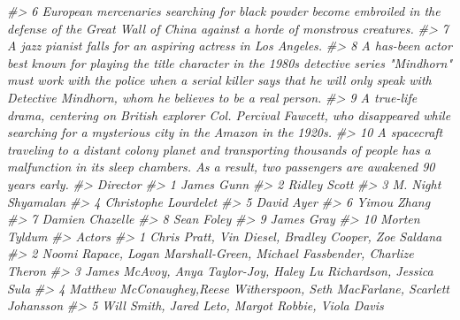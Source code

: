 \documentclass[
]{book}
\newenvironment{Shaded}{\begin{snugshade}}{\end{snugshade}}
\newcommand{\CommentTok}[1]{\textcolor[rgb]{0.56,0.35,0.01}{\textit{#1}}}
\begin{document}
\begin{Shaded}
\begin{Highlighting}[]
\CommentTok{\#\textgreater{} 6                                                                                               European mercenaries searching for black powder become embroiled in the defense of the Great Wall of China against a horde of monstrous creatures.}
\CommentTok{\#\textgreater{} 7                                                                                                                                                                                     A jazz pianist falls for an aspiring actress in Los Angeles.}
\CommentTok{\#\textgreater{} 8  A has{-}been actor best known for playing the title character in the 1980s detective series "Mindhorn" must work with the police when a serial killer says that he will only speak with Detective Mindhorn, whom he believes to be a real person.}
\CommentTok{\#\textgreater{} 9                                                                                        A true{-}life drama, centering on British explorer Col. Percival Fawcett, who disappeared while searching for a mysterious city in the Amazon in the 1920s.}
\CommentTok{\#\textgreater{} 10                                                        A spacecraft traveling to a distant colony planet and transporting thousands of people has a malfunction in its sleep chambers. As a result, two passengers are awakened 90 years early.}
\CommentTok{\#\textgreater{}                Director}
\CommentTok{\#\textgreater{} 1            James Gunn}
\CommentTok{\#\textgreater{} 2          Ridley Scott}
\CommentTok{\#\textgreater{} 3    M. Night Shyamalan}
\CommentTok{\#\textgreater{} 4  Christophe Lourdelet}
\CommentTok{\#\textgreater{} 5            David Ayer}
\CommentTok{\#\textgreater{} 6           Yimou Zhang}
\CommentTok{\#\textgreater{} 7       Damien Chazelle}
\CommentTok{\#\textgreater{} 8            Sean Foley}
\CommentTok{\#\textgreater{} 9            James Gray}
\CommentTok{\#\textgreater{} 10        Morten Tyldum}
\CommentTok{\#\textgreater{}                                                                        Actors}
\CommentTok{\#\textgreater{} 1                        Chris Pratt, Vin Diesel, Bradley Cooper, Zoe Saldana}
\CommentTok{\#\textgreater{} 2     Noomi Rapace, Logan Marshall{-}Green, Michael Fassbender, Charlize Theron}
\CommentTok{\#\textgreater{} 3            James McAvoy, Anya Taylor{-}Joy, Haley Lu Richardson, Jessica Sula}
\CommentTok{\#\textgreater{} 4  Matthew McConaughey,Reese Witherspoon, Seth MacFarlane, Scarlett Johansson}
\CommentTok{\#\textgreater{} 5                          Will Smith, Jared Leto, Margot Robbie, Viola Davis}

\end{Highlighting}
\end{Shaded}
\end{document}
